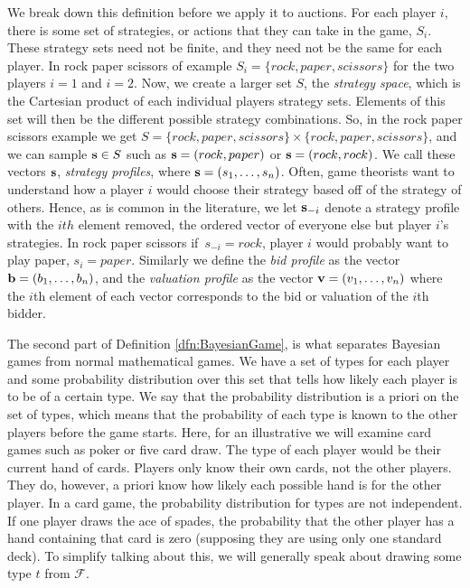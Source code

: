 \documentclass[12pt,twoside]{reedthesis}
\begin{document}
We break down this definition before we apply it to auctions. For each player $i$, there is some set of strategies, or actions that they can take in the game, $S_i$. These strategy sets need not be finite, and they need not be the same for each player. In rock paper scissors of example $S_i = \{rock, paper, scissors\}$ for the two players $i =1$ and $i = 2$. Now, we create a larger set $S$, the {\em strategy space}, which is the Cartesian product of each individual players strategy sets. Elements of this set will then be the different possible strategy combinations. So, in the rock paper scissors example we get $S = \{rock, paper, scissors\} \times \{rock, paper, scissors\}$, and we can sample $\textbf{s} \in S$ such as $\textbf{s} = (rock, paper)$ or $\textbf{s} = (rock, rock)$. We call these vectors $\textbf{s}$, {\em strategy profiles}, where $\textbf{s} = (s_1, \ldots, s_n)$. Often, game theorists want to understand how a player $i$ would choose their strategy based off of the strategy of others. Hence, as is common in the literature, we let $\textbf{s}_{-i}$ denote a strategy profile with the $ith$ element removed, the ordered vector of everyone else but player $i$'s strategies. In rock paper scissors if~$s_{-i} = {rock}$, player $i$ would probably want to play paper, $s_i = paper$. Similarly we define the {\em bid profile} as the vector $\textbf{b} = (b_1, \ldots, b_n)$, and the {\em valuation profile} as the vector $\textbf{v} = (v_1, \ldots, v_n)$ where the $i$th element of each vector corresponds to the bid or valuation of the $i$th bidder.

The second part of Definition \ref{dfn:BayesianGame}, is what separates Bayesian games from normal mathematical games. We have a set of types for each player and some probability distribution over this set that tells how likely each player is to be of a certain type. We say that the probability distribution is a priori on the set of types, which means that the probability of each type is known to the other players before the game starts. Here, for an illustrative we will examine card games such as poker or five card draw. The type of each player would be their current hand of cards. Players only know their own cards, not the other players. They do, however, a priori know how likely each possible hand is for the other player. In a card game, the probability distribution for types are not independent. If one player draws the ace of spades, the probability that the other player has a hand containing that card is zero (supposing they are using only one standard deck). To simplify talking about this, we will generally speak about drawing some type $t$ from $\mathcal{F}$.
\end{document}
